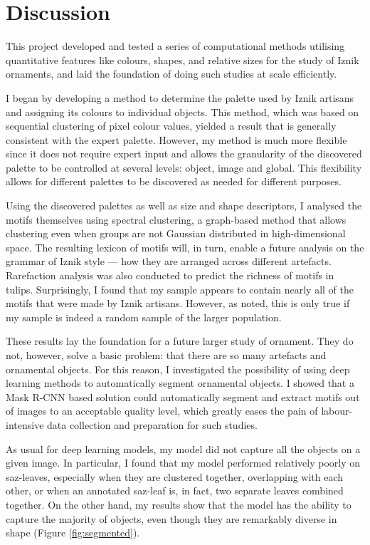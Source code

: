 \documentclass[11pt]{article}
\begin{document}
\section{Discussion}
This project developed and tested a series of computational methods utilising quantitative features like colours, shapes, and relative sizes for the study of Iznik ornaments, and laid the foundation of doing such studies at scale efficiently. \par
I began by developing a method to determine the palette used by Iznik artisans and assigning its colours to individual objects. This method, which was based on sequential clustering of pixel colour values, yielded a result that is generally consistent with the expert palette. However, my method is much more flexible since it does not require expert input and allows the granularity of the discovered palette to be controlled at several levels: object, image and global. This flexibility allows for different palettes to be discovered as needed for different purposes. \par
Using the discovered palettes as well as size and shape descriptors, I analysed the motifs themselves using spectral clustering, a graph-based method that allows clustering even when groups are not Gaussian distributed in high-dimensional space. The resulting lexicon of motifs will, in turn, enable a future analysis on the grammar of Iznik style --- how they are arranged across different artefacts. Rarefaction analysis was also conducted to predict the richness of motifs in tulips. Surprisingly, I found that my sample appears to contain nearly all of the motifs that were made by Iznik artisans. However, as noted, this is only true if my sample is indeed a random sample of the larger population. \par
These results lay the foundation for a future larger study of ornament. They do not, however, solve a basic problem: that there are so many artefacts and ornamental objects. For this reason, I investigated the possibility of using deep learning methods to automatically segment ornamental objects. I showed that a Mask R-CNN based solution could automatically segment and extract motifs out of images to an acceptable quality level, which greatly eases the pain of labour-intensive data collection and preparation for such studies. \par
As usual for deep learning models, my model did not capture all the objects on a given image. In particular, I found that my model performed relatively poorly on saz-leaves, especially when they are clustered together, overlapping with each other, or when an annotated saz-leaf is, in fact, two separate leaves combined together. On the other hand, my results show that the model has the ability to capture the majority of objects, even though they are remarkably diverse in shape (Figure \ref{fig:segmented}). \par
\end{document}
